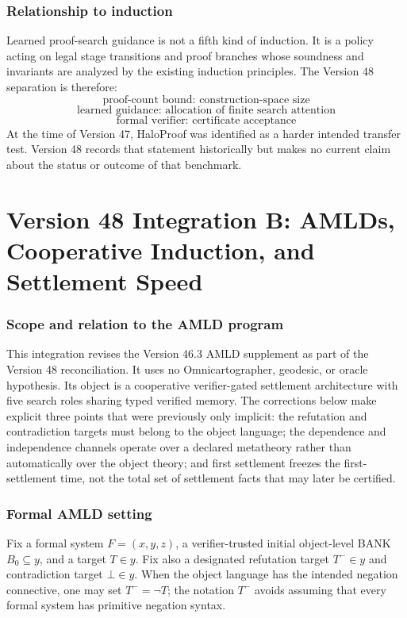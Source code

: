 \documentclass[11pt]{article}
\theoremstyle{remark}
\begin{document}
\section{Relationship to induction}
Learned proof-search guidance is not a fifth kind of induction. It is a policy acting on legal stage transitions and proof branches whose soundness and invariants are analyzed by the existing induction principles. The Version 48 separation is therefore:
\[
\boxed{\text{proof-count bound: construction-space size}}
\]
\[
\boxed{\text{learned guidance: allocation of finite search attention}}
\]
\[
\boxed{\text{formal verifier: certificate acceptance}}
\]
At the time of Version 47, HaloProof was identified as a harder intended transfer test. Version 48 records that statement historically but makes no current claim about the status or outcome of that benchmark.

\clearpage
\part*{Version 48 Integration B: AMLDs, Cooperative Induction, and Settlement Speed}
\setcounter{section}{0}
\section*{Scope and relation to the AMLD program}
This integration revises the Version 46.3 AMLD supplement as part of the Version 48 reconciliation. It uses no Omnicartographer, geodesic, or oracle hypothesis. Its object is a cooperative verifier-gated settlement architecture with five search roles sharing typed verified memory. The corrections below make explicit three points that were previously only implicit: the refutation and contradiction targets must belong to the object language; the dependence and independence channels operate over a declared metatheory rather than automatically over the object theory; and first settlement freezes the first-settlement time, not the total set of settlement facts that may later be certified.

\section{Formal AMLD setting}
Fix a formal system $F=(x,y,z)$, a verifier-trusted initial object-level BANK $B_0\subseteq y$, and a target $T\in y$. Fix also a designated refutation target $T^-\in y$ and contradiction target $\bot\in y$. When the object language has the intended negation connective, one may set $T^-=\neg T$; the notation $T^-$ avoids assuming that every formal system has primitive negation syntax.
\end{document}
